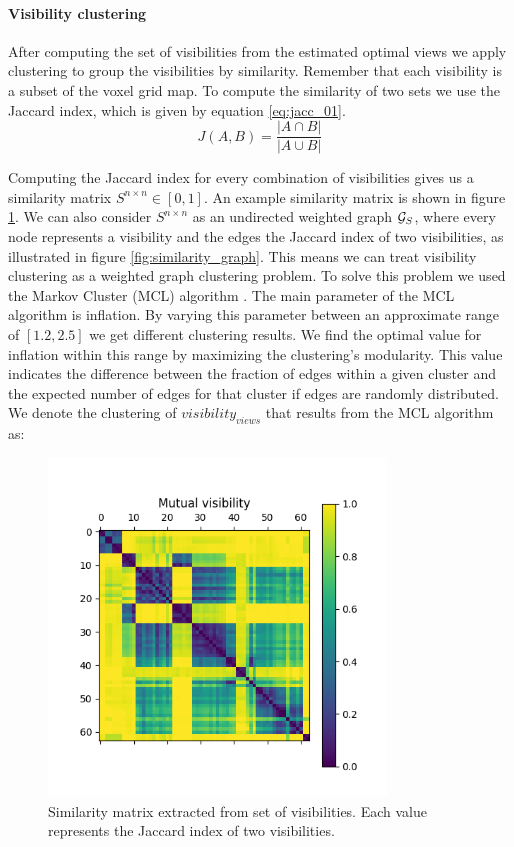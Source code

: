 \paragraph{Visibility clustering}
After computing the set of visibilities from the estimated optimal views we apply clustering to group the visibilities by similarity. Remember that each visibility is a subset of the voxel grid map. To compute the similarity of two sets we use the Jaccard index, which is given by equation \ref{eq:jacc_01}.
\begin{equation}
    \label{eq:jacc_01}
    J(A,B) = \frac{|A \cap B|}{|A \cup B|}
\end{equation}

Computing the Jaccard index for every combination of visibilities gives us a similarity matrix \(S^{n \times n} \in [0, 1]\).  An example similarity matrix is shown in figure \ref{fig:jaccard}. We can also consider \(S^{n \times n}\) as an undirected weighted graph \(\mathcal{G}_S\), where every node represents a visibility and the edges the Jaccard index of two visibilities, as illustrated in figure \ref{fig:similarity_graph}. This means we can treat visibility clustering as a weighted graph clustering problem. To solve this problem we used the Markov Cluster (MCL) algorithm \citep{van_dongen_cluster_2000}. The main parameter of the MCL algorithm is inflation. By varying this parameter between an approximate range of \([1.2, 2.5]\) we get different clustering results. We find the optimal value for inflation within this range by maximizing the clustering's modularity. This value indicates the difference between the fraction of edges within a given cluster and the expected number of edges for that cluster if edges are randomly distributed. We denote the clustering of \(visibility_{views}\) that results from the MCL algorithm as:


\begin{figure}[h]
    \centering
    \includegraphics*[width=0.8\textwidth]{./fig/mutual_visibility_matrix.png}
    \caption{Similarity matrix extracted from set of visibilities. Each value represents the Jaccard index of two visibilities.}
    \label{fig:jaccard}
\end{figure}

